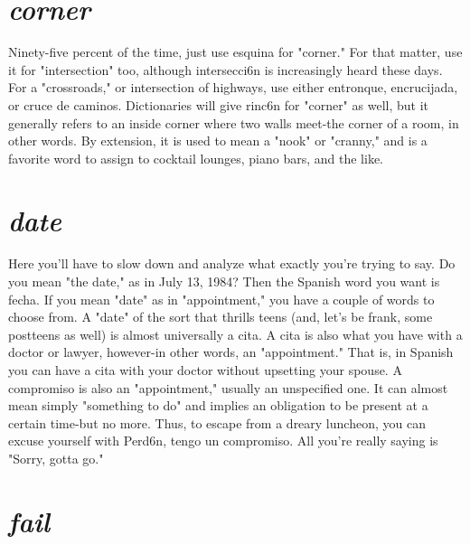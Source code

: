 \section{\emph{corner}}

Ninety-five percent of the time, just use esquina for "corner."
For that matter, use it for "intersection" too, although intersecci6n
is increasingly heard these days. For a "crossroads," or intersection
of highways, use either entronque, encrucijada, or cruce de caminos.
Dictionaries will give rinc6n for "corner" as well, but it generally refers to an inside corner where two walls meet-the corner of a room,
in other words. By extension, it is used to mean a "nook" or "cranny,"
and is a favorite word to assign to cocktail lounges, piano bars, and
the like.

\section{\emph{date}}

Here you'll have to slow down and analyze what exactly you're
trying to say. Do you mean "the date," as in July 13, 1984? Then the
Spanish word you want is fecha. If you mean "date" as in "appointment," you have a couple of words to choose from. A "date" of the sort
that thrills teens (and, let's be frank, some postteens as well) is almost
universally a cita. A cita is also what you have with a doctor or lawyer, however-in other words, an "appointment." That is, in Spanish
you can have a cita with your doctor without upsetting your spouse. A
compromiso is also an "appointment," usually an unspecified one. It
can almost mean simply "something to do" and implies an obligation
to be present at a certain time-but no more. Thus, to escape from a
dreary luncheon, you can excuse yourself with Perd6n, tengo un compromiso. All you're really saying is "Sorry, gotta go."

\section{\emph{fail}}


